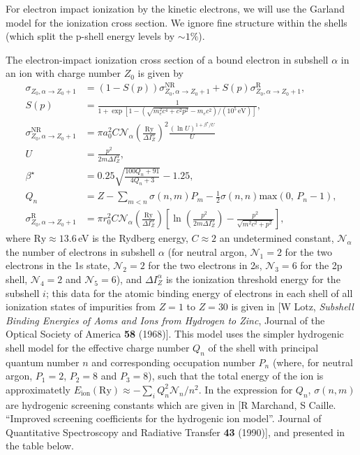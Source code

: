 \documentclass[11pt,a4paper]{article}
\newcommand{\sub}[1]{\ensuremath{_{\text{#1}}}}
\begin{document}
For electron impact ionization by the kinetic electrons, we will use the Garland model for the ionization cross section. We ignore fine structure within the shells (which split the p-shell energy levels by $\sim 1\%$).

The electron-impact ionization cross section of a bound electron in subshell $\alpha$ in an ion with charge number $Z_0$ is given by
\begin{align}
\sigma_{Z_0,\alpha \to  Z_0+1}& = (1-S(p))\sigma_{Z_0,\alpha \to  Z_0+1}^\text{NR} + S(p) \sigma_{Z_0,\alpha\to Z_0+1}^\text{R}, \nonumber \\
S(p) &= \frac{1}{1+ \exp[ 1 - (\sqrt{m_e^2 c^4+c^2 p^2}-m_e c^2)/(10^5\,\text{eV})]}, \nonumber \\
\sigma_{Z_0,\alpha\to Z_0+1}^\text{NR} &= \pi a_0^2 C \mathcal{N}_\alpha \left(\frac{\text{Ry}}{\Delta I_Z^\alpha}\right)^2\frac{(\ln U)^{1+\beta^\star/U}}{U} \nonumber \\
U &= \frac{p^2}{2m\Delta I_Z^\alpha}, \nonumber \\
\beta^\star &= 0.25\sqrt{\frac{100Q_n+91}{4Q_n+3}}-1.25, \nonumber \\
Q_n &=  Z - \sum_{m<n} \sigma(n,m) P_m - \frac{1}{2}\sigma(n,n)\text{max}(0,\,P_n-1), \nonumber \\
\sigma_{Z_0,\alpha\to Z_0+1}^\text{R} &= \pi r_0^2 C \mathcal{N}_\alpha\left(\frac{\text{Ry}}{\Delta I_Z^\alpha}\right) \left[\ln\left(\frac{p^2}{2m\Delta I_Z^\alpha}\right) - \frac{p^2}{\sqrt{m^2c^2+p^2}}\right],
\end{align}
where $\text{Ry} \approx 13.6\,$eV is the Rydberg energy, $C \approx 2$ an undetermined constant, $\mathcal{N}_\alpha$ the number of electrons in subshell $\alpha$ (for neutral argon, $\mathcal{N}_1 = 2$ for the two electrons in the 1s state, $\mathcal{N}_2 = 2$ for the two electrons in 2s, $\mathcal{N}_3=6$ for the 2p shell, $\mathcal{N}_4 = 2$ and $\mathcal{N}_5=6$), and $\Delta I_Z^\alpha$ is the ionization threshold energy for the subshell $i$; this data for the atomic binding energy of electrons in each shell of all ionization states of impurities from $Z=1$ to $Z=30$ is given in [W Lotz, \emph{Subshell Binding Energies of Aoms and Ions from Hydrogen to Zinc}, Journal of the Optical Society of America {\bf 58} (1968)]. This model uses the simpler hydrogenic shell model for the effective charge number $Q_n$ of the shell with principal quantum number $n$ and corresponding occupation number $P_n$ (where, for neutral argon, $P_1=2$, $P_2 = 8$ and $P_3 = 8$), such that the total energy of the ion is approximatetly $E\sub{ion}(\text{Ry}) \approx - \sum_i Q_n^2\mathcal{N}_n/n^2$. In the expression for $Q_n$, $\sigma(n,m)$ are hydrogenic screening constants which are given in [R Marchand, S Caille. ``Improved screening coefficients for the hydrogenic ion model''. Journal of Quantitative Spectroscopy and Radiative Transfer {\bf 43} (1990)], and presented in the table below.
\end{document}
